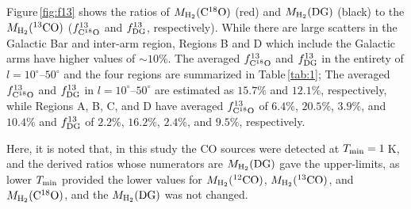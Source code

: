 \documentclass[proof]{pasj01}
\newcommand{\ffDG}{f^{13}_{\rm DG}}
\newcommand{\ffeight}{f^{13}_{\rm C^{18}O}}
\newcommand{\mDG}{M_{\rm H_2}{\rm (DG)}}
\newcommand{\mtwo}{M_{\rm H_2}{\rm (^{12}CO)}}
\newcommand{\mthree}{M_{\rm H_2}{\rm (^{13}CO)}}
\newcommand{\meight}{M_{\rm H_2}{\rm (C^{18}O)}}
\begin{document}
Figure\,\ref{fig:f13} shows the ratios of $\meight$ (red) and $\mDG$ (black) to the $\mthree$ ($\ffeight$ and $\ffDG$, respectively).
While there are large scatters in the Galactic Bar and inter-arm region, Regions B and D which include the Galactic arms have higher values of $\sim10\%$.
The averaged $\ffeight$ and $\ffDG$ in the entirety of $l=10^\circ$--$50^\circ$ and the four regions are summarized in Table\,\ref{tab:1}; 
The averaged $\ffeight$ and $\ffDG$ in $l=10^\circ$--$50^\circ$ are estimated as $15.7\%$ and $12.1\%$, respectively, while Regions A, B, C, and D have averaged $\ffeight$ of $6.4\%$, $20.5\%$, $3.9\%$, and $10.4\%$ and $\ffDG$ of $2.2\%$, $16.2\%$, $2.4\%$, and $9.5\%$, respectively.

Here, it is noted that, in this study the CO sources were detected at $T_{\rm min} = 1$\,K, and the derived ratios whose numerators are $\mDG$ gave the upper-limits, as lower $T_{\rm min}$ provided the lower values for $\mtwo$, $\mthree$, and $\meight$, and the $\mDG$ was not changed.
\end{document}
